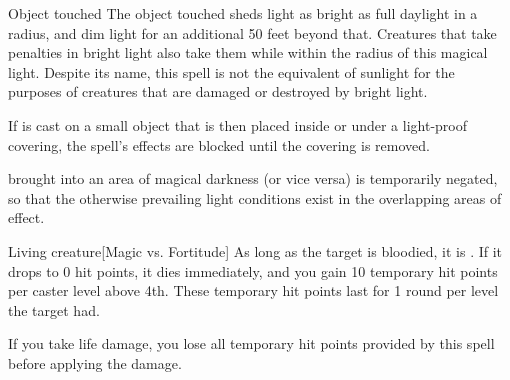 \begin{spellheader}
    \spellrng{\rngtouch}
    \spelldur{\durlong \dismissable}
\end{spellheader}
\begin{spelleffects}
    \begin{spelltarget}{Object touched}
        \spelleffect The object touched sheds light as bright as full daylight in a \arealarge radius, and dim light for an additional 50 feet beyond that. Creatures that take penalties in bright light also take them while within the radius of this magical light. Despite its name, this spell is not the equivalent of sunlight for the purposes of creatures that are damaged or destroyed by bright light.
        \par If  is cast on a small object that is then placed inside or under a light-proof covering, the spell's effects are blocked until the covering is removed.
    \end{spelltarget}
\end{spelleffects}
\begin{spellfooter}
    \spellnotes {} brought into an area of magical darkness (or vice versa) is temporarily negated, so that the otherwise prevailing light conditions exist in the overlapping areas of effect.
\end{spellfooter}

\begin{spellheader}
    \spellrng{\rngmed}
\end{spellheader}
\begin{spelleffects}
    \begin{spelltarget}{Living creature}[Magic vs. Fortitude]
        \spellsuccess As long as the target is bloodied, it is \vulnerable. If it drops to 0 hit points, it dies immediately, and you gain 10 temporary hit points  per caster level above 4th. These temporary hit points last for 1 round per level the target had.
    \end{spelltarget}
\end{spelleffects}
\begin{spellfooter}
    \spellnotes If you take life damage, you lose all temporary hit points provided by this spell before applying the damage.
\end{spellfooter}

